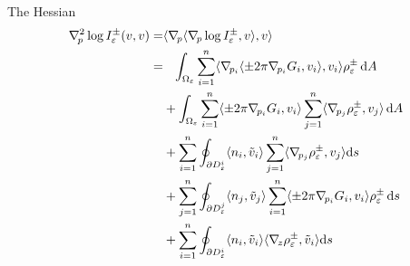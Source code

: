 \documentclass[a4paper]{amsart}
\newcommand{\Hess}{\nabla^2}
\newcommand{\dd}{{\rm d}}
\theoremstyle{plain} %
\theoremstyle{definition} %
\theoremstyle{remark}
\begin{document}
The Hessian
\begin{align}
	\Hess_{\! p} \log I^\pm_\varepsilon (v , v)
	=&
	\langle \nabla_{\! p} \langle \nabla_{\! p} \log I^\pm_\varepsilon, v\rangle, v \rangle \nonumber \\
	=&\phantom{+}
	\int_{\Omega_\varepsilon} \sum_{i=1}^n \langle \nabla_{\! p_i} \langle \pm 2\pi \nabla_{\! p_i} G_i, v_i \rangle, v_i \rangle \rho_\varepsilon^\pm \, \dd A \label{eq:l1}\\
	&+ \int_{\Omega_\varepsilon} \sum_{i=1}^n \langle \pm 2\pi \nabla_{\! p_i} G_i, v_i \rangle \sum_{j=1}^n \langle \nabla_{\! p_j} \rho_\varepsilon^\pm, v_j \rangle \, \dd A \label{eq:l2}\\
	&+ \sum_{i=1}^n \oint_{\partial D^i_\varepsilon} \langle n_i, \tilde v_i \rangle \sum_{j=1}^n \langle \nabla_{\! p_j} \rho_\varepsilon^\pm, v_j \rangle \dd s \label{eq:l3}\\
	&+ \sum_{j=1}^n \oint_{\partial D^j_\varepsilon} \langle n_j, \tilde v_j \rangle \sum_{i=1}^n \langle \pm 2\pi \nabla_{\! p_i} G_i, v_i \rangle \rho_\varepsilon^\pm \, \dd s \label{eq:l4}\\
	&+ \sum_{i=1}^n \oint_{\partial D^i_\varepsilon} \langle n_i, \tilde v_i \rangle \langle \nabla_{\! z} \rho_\varepsilon^\pm, \tilde v_i \rangle \dd s \nonumber
\end{align}
\end{document}
